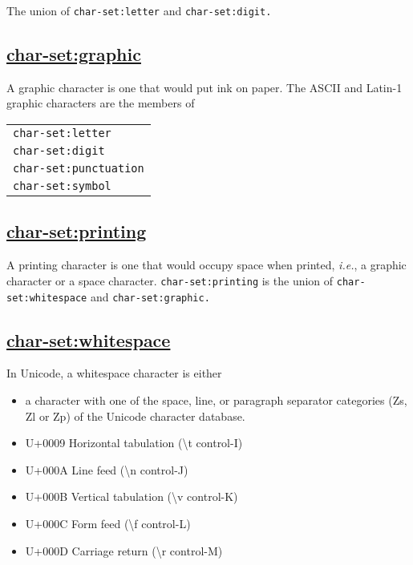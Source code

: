 The union of \texttt{char-set:letter} and \texttt{char-set:digit.}

\subsection{\texorpdfstring{\href{}{char-set:graphic}}{char-set:graphic}}\label{char-setgraphic}

A graphic character is one that would put ink on paper. The ASCII and
Latin-1 graphic characters are the members of

\begin{longtable}[]{@{}l@{}}
\toprule
\texttt{char-set:letter}\tabularnewline
\texttt{char-set:digit}\tabularnewline
\texttt{char-set:punctuation}\tabularnewline
\texttt{char-set:symbol}\tabularnewline
\bottomrule
\end{longtable}

\subsection{\texorpdfstring{\href{}{char-set:printing}}{char-set:printing}}\label{char-setprinting}

A printing character is one that would occupy space when printed,
\emph{i.e.}, a graphic character or a space character.
\texttt{char-set:printing} is the union of \texttt{char-set:whitespace}
and \texttt{char-set:graphic.}

\subsection{\texorpdfstring{\href{}{char-set:whitespace}}{char-set:whitespace}}\label{char-setwhitespace}

In Unicode, a whitespace character is either

\begin{itemize}
\tightlist
\item
  a character with one of the space, line, or paragraph separator
  categories (Zs, Zl or Zp) of the Unicode character database.
\item
  U+0009 Horizontal tabulation (\textbackslash{}t control-I)
\item
  U+000A Line feed (\textbackslash{}n control-J)
\item
  U+000B Vertical tabulation (\textbackslash{}v control-K)
\item
  U+000C Form feed (\textbackslash{}f control-L)
\item
  U+000D Carriage return (\textbackslash{}r control-M)
\end{itemize}


